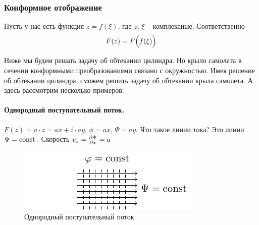 \subsubsection{Конформное отображение}
Пусть у нас есть функция
	$z=f(\xi)$, где $z$, $\xi$ -- комплексные. Соответственно
\begin{equation}
	F(z)=F\qty(\vphantom{\vec{b}}f(\xi))
\end{equation}

Ниже мы будем решать задачу об обтекании цилиндра. Но крыло самолета в сечении конформными преобразованиями связано с
окружностью. Имея  решение об обтекании цилиндра, сможем решить задачу об обтекании крыла самолета. А здесь рассмотрим несколько примеров.

\paragraph{Однородный поступательный поток.} $F(z)=a\cdot z=ax+i\cdot ay$, $\phi=ax$, $\Psi=ay$. Что такое линии тока? Это линии $\Psi=\mathrm{const}\,$. Скорость $v_x=\pdv{\Psi}{x}=a$

\begin{figure}[h!]
    \centering
    \includegraphics[scale=1.5]{img/potent}
    \caption{Однородный поступательный поток}
    \label{fig:figure1}
\end{figure}





